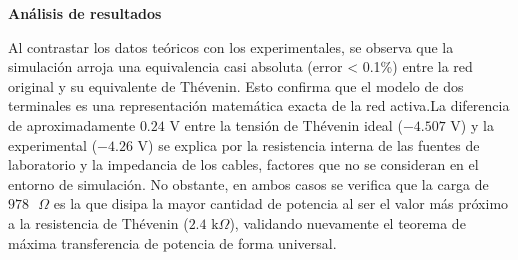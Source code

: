 \textbf{Análisis de resultados}

Al contrastar los datos teóricos con los experimentales, se observa que la simulación arroja una equivalencia casi absoluta (error < 0.1\%) entre la red original y su equivalente de Thévenin. Esto confirma que el modelo de dos terminales es una representación matemática exacta de la red activa.La diferencia de aproximadamente $0.24 \text{ V}$ entre la tensión de Thévenin ideal ($-4.507 \text{ V}$) y la experimental ($-4.26 \text{ V}$) se explica por la resistencia interna de las fuentes de laboratorio y la impedancia de los cables, factores que no se consideran en el entorno de simulación. No obstante, en ambos casos se verifica que la carga de $978 \text{ }\Omega$ es la que disipa la mayor cantidad de potencia al ser el valor más próximo a la resistencia de Thévenin ($2.4 \text{ k}\Omega$), validando nuevamente el teorema de máxima transferencia de potencia de forma universal.